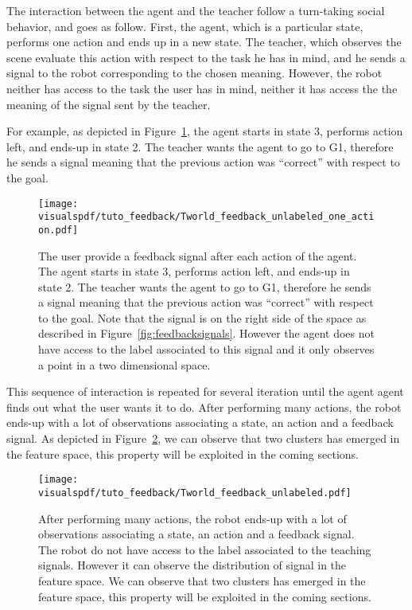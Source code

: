 The interaction between the agent and the teacher follow a turn-taking social behavior, and goes as follow. First, the agent, which is a particular state, performs one action and ends up in a new state. The teacher, which observes the scene evaluate this action with respect to the task he has in mind, and he sends a signal to the robot corresponding to the chosen meaning. However, the robot neither has access to the task the user has in mind, neither it has access the the meaning of the signal sent by the teacher.

For example, as depicted in Figure~\ref{fig:TworldOneStepUnlabeled}, the agent starts in state 3, performs action left, and ends-up in state 2. The teacher wants the agent to go to G1, therefore he sends a signal meaning that the previous action was ``correct'' with respect to the goal.

\begin{figure}[!ht]
  \centering
  \texttt{[image: \\visualspdf/tuto\_feedback/Tworld\_feedback\_unlabeled\_one\_action.pdf]}
  \caption{The user provide a feedback signal after each action of the agent. The agent starts in state 3, performs action left, and ends-up in state 2. The teacher wants the agent to go to G1, therefore he sends a signal meaning that the previous action was ``correct'' with respect to the goal. Note that the signal is on the right side of the space as described in Figure~\ref{fig:feedbacksignals}. However the agent does not have access to the label associated to this signal and it only observes a point in a two dimensional space.}
  \label{fig:TworldOneStepUnlabeled}
\end{figure}

This sequence of interaction is repeated for several iteration until the agent agent finds out what the user wants it to do. After performing many actions, the robot ends-up with a lot of observations associating a state, an action and a feedback signal. As depicted in Figure~\ref{fig:TworldManyStepUnlabeled}, we can observe that two clusters has emerged in the feature space, this property will be exploited in the coming sections.

\begin{figure}[!ht]
  \centering
  \texttt{[image: \\visualspdf/tuto\_feedback/Tworld\_feedback\_unlabeled.pdf]}
  \caption{After performing many actions, the robot ends-up with a lot of observations associating a state, an action and a feedback signal. The robot do not have access to the label associated to the teaching signals. However it can observe the distribution of signal in the feature space. We can observe that two clusters has emerged in the feature space, this property will be exploited in the coming sections.}
  \label{fig:TworldManyStepUnlabeled}
\end{figure}

